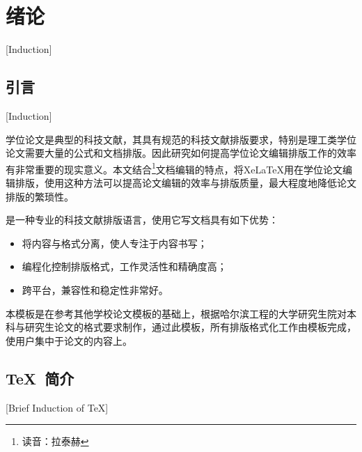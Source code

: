 
%
%
%


\chapter{绪论}[Induction]
\label{chap01}

\section{引言}[Induction]

学位论文是典型的科技文献，其具有规范的科技文献排版要求，特别是理工类学位论文需要大量的公式和文档排版。因此研究如何提高学位论文编辑排版工作的效率有非常重要的现实意义。本文结合\XeLaTeX{}\footnote{读音：拉泰赫}文档编辑的特点，将Xe\LaTeX{}用在学位论文编辑排版，使用这种方法可以提高论文编辑的效率与排版质量，最大程度地降低论文排版的繁琐性。

\XeLaTeX{}是一种专业的科技文献排版语言，使用它写文档具有如下优势：
\begin{itemize}
    \item 将内容与格式分离，使人专注于内容书写；
    \item 编程化控制排版格式，工作灵活性和精确度高；
    \item 跨平台，兼容性和稳定性非常好。
\end{itemize}

本模板是在参考其他学校论文模板的基础上，根据哈尔滨工程的大学研究生院对本科与研究生论文的格式要求制作，通过此模板，所有排版格式化工作由模板完成，使用户集中于论文的内容上。

\section{TeX~简介}[Brief Induction of TeX]

